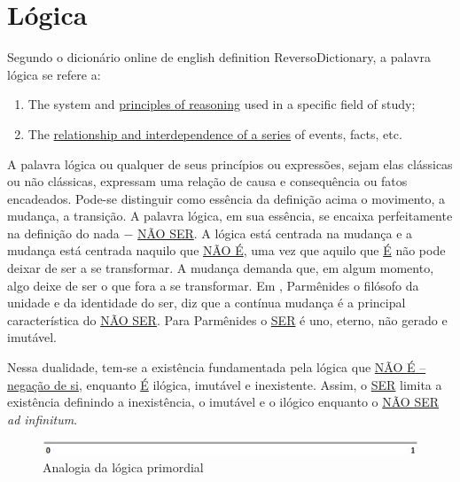 \section{Lógica}
Segundo o dicionário online de english definition ReversoDictionary\cite{dicio_logica}, a palavra lógica se refere a:
	\begin{enumerate}
	   \item The system and \underline{principles of reasoning} used in a specific field of study;
	   \item The \underline{relationship and interdependence of a series} of events, facts, etc. 
	\end{enumerate}
 
\bigbreak
A palavra lógica ou qualquer de seus princípios ou expressões, sejam elas clássicas ou não clássicas, expressam uma relação de causa e consequência ou fatos encadeados. Pode-se distinguir como essência da definição acima o movimento, a mudança, a transição. A palavra lógica, em sua essência, se encaixa perfeitamente na definição do nada − \underline{NÃO SER}. A lógica está centrada na mudança e a mudança está centrada naquilo que \underline{NÃO É}, uma vez que aquilo que \underline{É} não pode deixar de ser a se transformar. A mudança demanda que, em algum momento, algo deixe de ser o que fora a se transformar. Em , Parmênides  o filósofo da unidade e da identidade do ser, diz que a contínua mudança é a principal característica do \underline{NÃO SER}. Para Parmênides o \underline{SER} é uno, eterno, não gerado e imutável.

Nessa dualidade, tem-se a existência fundamentada pela lógica que \underline{NÃO É – negação de si}, enquanto \underline{É} ilógica, imutável e inexistente. Assim, o \underline{SER} limita a existência definindo a inexistência, o imutável e o ilógico enquanto o \underline{NÃO SER} \textit{ad infinitum}.
	\begin{figure}[H]
	\caption{Analogia da lógica primordial}
	\label{fig:primordial_logic_representation}
	\centering
	\includegraphics[scale=.9]{sections/images/primordial_logic_representation.jpg}
	\end{figure}


